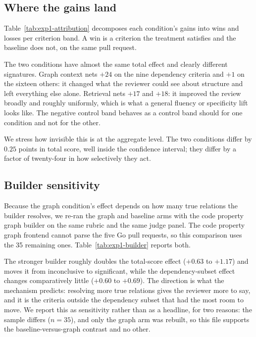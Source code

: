 \documentclass[conference]{IEEEtran}
\begin{document}
\subsection{Where the gains land}
\label{sec:exp1-attribution}

Table~\ref{tab:exp1-attribution} decomposes each condition's gains into wins
and losses per criterion band. A win is a criterion the treatment satisfies
and the baseline does not, on the same pull request.



The two conditions have almost the same total effect and clearly different
signatures. Graph context nets $+24$ on the nine dependency criteria and
$+1$ on the sixteen others: it changed what the reviewer could see about
structure and left everything else alone. Retrieval nets $+17$ and $+18$:
it improved the review broadly and roughly uniformly, which is what a
general fluency or specificity lift looks like. The negative control band
behaves as a control band should for one condition and not for the other.

We stress how invisible this is at the aggregate level. The two conditions
differ by $0.25$ points in total score, well inside the confidence interval;
they differ by a factor of twenty-four in how selectively they act.

\subsection{Builder sensitivity}
\label{sec:exp1-builder}

Because the graph condition's effect depends on how many true relations the
builder resolves, we re-ran the graph and baseline arms with the code
property graph builder on the same rubric and the same judge panel. The code
property graph frontend cannot parse the five Go pull requests, so this
comparison uses the 35 remaining ones. Table~\ref{tab:exp1-builder} reports
both.



The stronger builder roughly doubles the total-score effect ($+0.63$ to
$+1.17$) and moves it from inconclusive to significant, while the
dependency-subset effect changes comparatively little ($+0.60$ to $+0.69$).
The direction is what the mechanism predicts: resolving more true relations
gives the reviewer more to say, and it is the criteria outside the dependency
subset that had the most room to move. We report this as sensitivity rather
than as a headline, for two reasons: the sample differs ($n=35$), and only
the graph arm was rebuilt, so this file supports the baseline-versus-graph
contrast and no other.
\end{document}
